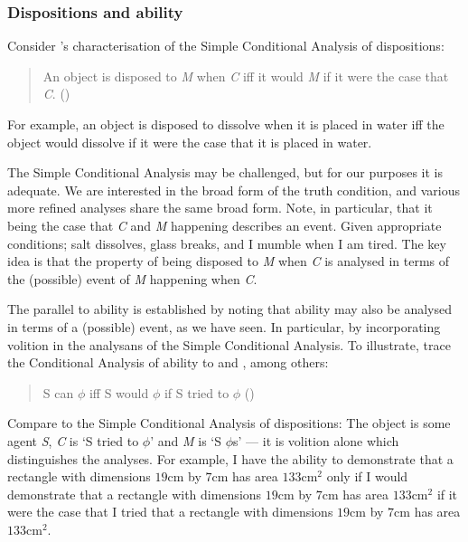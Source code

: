 \subsubsection{Dispositions and ability}
\label{sec:dispositions}

\begin{note}
  Consider \citeauthor{Choi:2021wg}'s characterisation of the Simple Conditional Analysis of dispositions:
  \begin{quote}
    An object is disposed to \emph{M} when \emph{C} iff it would \emph{M} if it were the case that \emph{C}.\nolinebreak
    \mbox{}\hfill\mbox{(\citeyear{Choi:2021wg})}
  \end{quote}
  For example, an object is disposed to dissolve when it is placed in water iff the object would dissolve if it were the case that it is placed in water.

  The Simple Conditional Analysis may be challenged, but for our purposes it is adequate.
  We are interested in the broad form of the truth condition, and various more refined analyses share the same broad form.
  Note, in particular, that it being the case that \emph{C} and \emph{M} happening describes an event.
  Given appropriate conditions; salt dissolves, glass breaks, and I mumble when I am tired.
  The key idea is that the property of being disposed to \emph{M} when \emph{C} is analysed in terms of the (possible) event of \emph{M} happening when \emph{C}.

  The parallel to ability is established by noting that ability may also be analysed in terms of a (possible) event, as we have seen.
  In particular, by incorporating volition in the analysans of the Simple Conditional Analysis.
  To illustrate, \citeauthor{Mandelkern:2017aa} trace the Conditional Analysis of ability  to \textcite{Hume:1748tp} and \textcite{Moore:1912te}, among others:
  \begin{quote}
    S can \(\phi\) iff S would \(\phi\) if S tried to \(\phi\)\nolinebreak
    \mbox{}\hfill\mbox{(\citeyear[Cf.][308]{Mandelkern:2017aa})}
  \end{quote}
  Compare to the Simple Conditional Analysis of dispositions:
  The object is some agent \emph{S}, \emph{C} is `S tried to \(\phi\)' and \emph{M} is `S \(\phi\)s' --- it is volition alone which distinguishes the analyses.
  For example, I have the ability to demonstrate that a rectangle with dimensions \(19\text{cm}\) by \(7\text{cm}\) has area \(133\text{cm}^{2}\) only if I would demonstrate that a rectangle with dimensions \(19\text{cm}\) by \(7\text{cm}\) has area \(133\text{cm}^{2}\) if it were the case that I tried that a rectangle with dimensions \(19\text{cm}\) by \(7\text{cm}\) has area \(133\text{cm}^{2}\).
\end{note}


